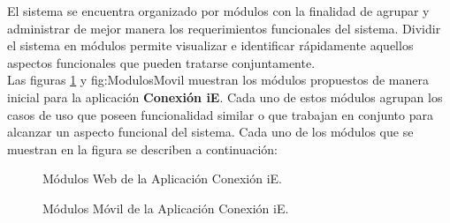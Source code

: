 
	El sistema se encuentra organizado por módulos con la finalidad de agrupar y administrar de mejor manera los requerimientos funcionales del sistema. Dividir el sistema en módulos permite visualizar e identificar rápidamente aquellos aspectos funcionales que pueden tratarse conjuntamente. \\

    Las figuras \ref{fig:ModulosWeb} y {fig:ModulosMovil} muestran los módulos propuestos de manera inicial para la aplicación \textbf{Conexión iE}. Cada uno de estos módulos agrupan los casos de uso que poseen funcionalidad similar o que trabajan en conjunto para alcanzar un aspecto funcional del sistema. Cada uno de los módulos que se muestran en la figura se describen a continuación:


    \begin{figure}[h!]
	\begin{center}
	\caption{Módulos Web de la Aplicación Conexión iE.}
	\label{fig:ModulosWeb}
	\end{center}
    \end{figure}

    \begin{figure}[h!]
	\begin{center}
		\caption{Módulos Móvil de la Aplicación Conexión iE.}
		\label{fig:ModulosMovil}
	\end{center}
\end{figure}


